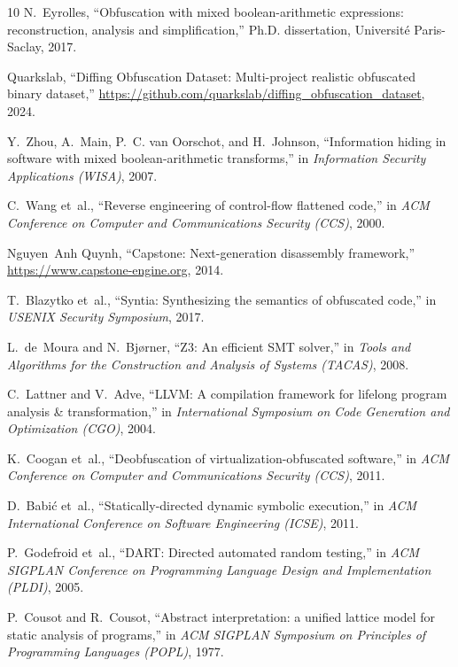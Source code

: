 \documentclass[11pt,a4paper]{article}
\begin{document}
\begin{thebibliography}{10}
N.~Eyrolles, ``Obfuscation with mixed boolean-arithmetic expressions: reconstruction, analysis and simplification,'' Ph.D. dissertation, Universit{\'e} Paris-Saclay, 2017.

Quarkslab, ``Diffing Obfuscation Dataset: Multi-project realistic obfuscated binary dataset,'' \url{https://github.com/quarkslab/diffing_obfuscation_dataset}, 2024.

Y.~Zhou, A.~Main, P.~C. van Oorschot, and H.~Johnson, ``Information hiding in software with mixed boolean-arithmetic transforms,'' in \emph{Information Security Applications (WISA)}, 2007.

C.~Wang et~al., ``Reverse engineering of control-flow flattened code,'' in \emph{ACM Conference on Computer and Communications Security (CCS)}, 2000.

Nguyen~Anh Quynh, ``Capstone: Next-generation disassembly framework,'' \url{https://www.capstone-engine.org}, 2014.

T.~Blazytko et~al., ``Syntia: Synthesizing the semantics of obfuscated code,'' in \emph{USENIX Security Symposium}, 2017.

L.~de~Moura and N.~Bj{\o}rner, ``Z3: An efficient SMT solver,'' in \emph{Tools and Algorithms for the Construction and Analysis of Systems (TACAS)}, 2008.

C.~Lattner and V.~Adve, ``LLVM: A compilation framework for lifelong program analysis \& transformation,'' in \emph{International Symposium on Code Generation and Optimization (CGO)}, 2004.

K.~Coogan et~al., ``Deobfuscation of virtualization-obfuscated software,'' in \emph{ACM Conference on Computer and Communications Security (CCS)}, 2011.

D.~Babi{\'c} et~al., ``Statically-directed dynamic symbolic execution,'' in \emph{ACM International Conference on Software Engineering (ICSE)}, 2011.

P.~Godefroid et~al., ``DART: Directed automated random testing,'' in \emph{ACM SIGPLAN Conference on Programming Language Design and Implementation (PLDI)}, 2005.

P.~Cousot and R.~Cousot, ``Abstract interpretation: a unified lattice model for static analysis of programs,'' in \emph{ACM SIGPLAN Symposium on Principles of Programming Languages (POPL)}, 1977.


\end{thebibliography}
\end{document}
